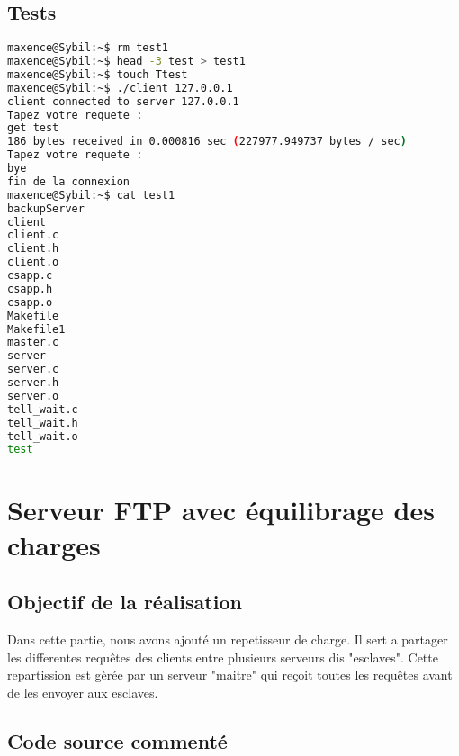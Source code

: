 \documentclass{report}
\begin{document}
      \section{Tests}
      \begin{lstlisting}[frame=single,basicstyle=\footnotesize,language=bash]
maxence@Sybil:~$ rm test1
maxence@Sybil:~$ head -3 test > test1
maxence@Sybil:~$ touch Ttest
maxence@Sybil:~$ ./client 127.0.0.1
client connected to server 127.0.0.1
Tapez votre requete :
get test
186 bytes received in 0.000816 sec (227977.949737 bytes / sec)
Tapez votre requete :
bye
fin de la connexion
maxence@Sybil:~$ cat test1
backupServer
client
client.c
client.h
client.o
csapp.c
csapp.h
csapp.o
Makefile
Makefile1
master.c
server
server.c
server.h
server.o
tell_wait.c
tell_wait.h
tell_wait.o
test
\end{lstlisting}

    \chapter{Serveur FTP avec \'equilibrage des charges}
      \section{Objectif de la r\'ealisation}
	Dans cette partie, nous avons ajout\'e un repetisseur de charge. Il sert a partager les differentes requ\^etes des clients entre plusieurs serveurs dis "esclaves". Cette repartission est g\`er\'ee par un serveur "maitre" qui re\c coit toutes les requ\^etes avant de les envoyer aux esclaves.
      \section{Code source comment\'e}
\end{document}
